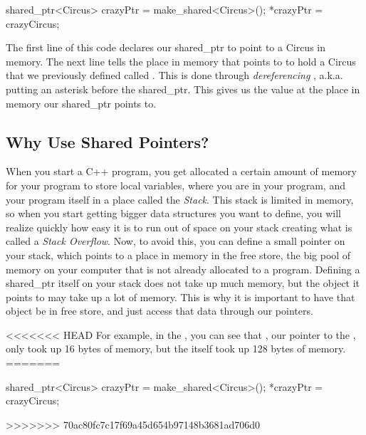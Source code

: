 \documentclass{tufte-handout}
\begin{document}
\begin{Code}
shared_ptr<Circus> crazyPtr = make_shared<Circus>();
*crazyPtr = crazyCircus;
\end{Code}

\noindent
The first line of this code declares our shared\_ptr to point to a Circus in memory.  
The next line tells the place in memory that   points to to hold a Circus that we previously defined called .  
This is done through \textit{dereferencing} , a.k.a. putting an asterisk before the shared\_ptr.  
This gives us the value at the place in memory our shared\_ptr points to.

\subsection{Why Use Shared Pointers?}
When you start a C++ program, you get allocated a certain amount of memory for your program to store local variables, where you are in your program, and your program itself in a place called the \textit{Stack}.
This stack is limited in memory, so when you start getting bigger data structures you want to define, you will realize quickly how easy it is to run out of space on your stack creating what is called a \textit{Stack Overflow}.
Now, to avoid this, you can define a small pointer on your stack, which points to a place in memory in the free store, the big pool of memory on your computer that is not already allocated to a program.
Defining a shared\_ptr itself on your stack does not take up much memory, but the object it points to may take up a lot of memory.  
This is why it is important to have that object be in free store, and just access that data through our pointers.

<<<<<<< HEAD
For example, in the , you can see that , our pointer to the , only took up 16 bytes of memory, but the  itself took up 128 bytes of memory.
=======
\begin{Code}
shared_ptr<Circus> crazyPtr = make_shared<Circus>();
*crazyPtr = crazyCircus;
\end{Code}
>>>>>>> 70ac80fc7c17f69a45d654b97148b3681ad706d0
\end{document}
